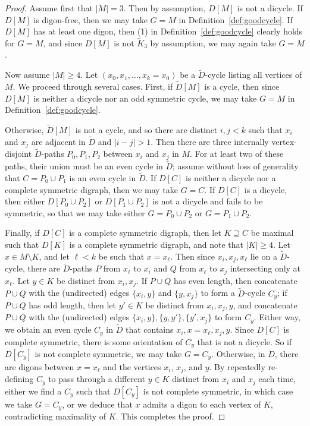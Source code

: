 \documentclass[psamsfonts]{amsart}
\theoremstyle{definition}
\theoremstyle{remark}
\numberwithin{equation}{section}
\begin{document}
\begin{proof}
    Assume first that $\vert M \vert = 3$. Then by assumption, $D[M]$ is not a dicycle. If $D[M]$ is digon-free, then we may take $G = M$ in Definition~\ref{def:goodcycle}. If $D[M]$ has at least one digon, then (1) in Definition~\ref{def:goodcycle} clearly holds for $G = M$, and since $D[M]$ is not $\overleftrightarrow{K}_3$ by assumption, we may again take $G = M$.

    Now assume $\vert M \vert \geq 4$. Let $(x_0, x_1, \dots, x_k = x_0)$ be a $\tilde{D}$-cycle listing all vertices of $M$. We proceed through several cases. First, if $\tilde{D}[M]$ is a cycle, then since $D[M]$ is neither a dicycle nor an odd symmetric cycle, we may take $G = M$ in Definition~\ref{def:goodcycle}.
    
    Otherwise, $\tilde{D}[M]$ is not a cycle, and so there are distinct $i, j < k$ such that $x_i$ and $x_j$ are adjacent in $\tilde{D}$ and $\vert i - j \vert > 1$. Then there are three internally vertex-disjoint $\tilde{D}$-paths $P_0, P_1, P_2$ between $x_i$ and $x_j$ in $M$. For at least two of these paths, their union must be an even cycle in $\tilde{D}$; assume without loss of generality that $C = P_0 \cup P_1$ is an even cycle in $\tilde{D}$. If $D[C]$ is neither a dicycle nor a complete symmetric digraph, then we may take $G = C$. If $D[C]$ is a dicycle, then either $D[P_0 \cup P_2]$ or $D[P_1 \cup P_2]$ is not a dicycle and fails to be symmetric, so that we may take either $G = P_0 \cup P_2$ or $G = P_1 \cup P_2$. 

    Finally, if $D[C]$ is a complete symmetric digraph, then let $K \supseteq C$ be maximal such that $D[K]$ is a complete symmetric digraph, and note that $\vert K \vert \geq 4$. Let $x \in M \setminus K$, and let $\ell < k$ be such that $x = x_{\ell}$. Then since $x_i, x_j, x_{\ell}$ lie on a $\tilde{D}$-cycle, there are $\tilde{D}$-paths $P$ from $x_{\ell}$ to $x_i$ and $Q$ from $x_{\ell}$ to $x_j$ intersecting only at $x_{\ell}$. Let $y \in K$ be distinct from $x_i, x_j$. If $P \cup Q$ has even length, then concatenate $P \cup Q$ with the (undirected) edges $\{x_i, y\}$ and $\{y, x_j\}$ to form a $\tilde{D}$-cycle $C_y$; if $P \cup Q$ has odd length, then let $y' \in K$ be distinct from $x_i, x_j, y$, and concatenate $P \cup Q$ with the (undirected) edges $\{x_i, y\}, \{y, y'\}, \{y', x_j\}$ to form $C_y$. Either way, we obtain an even cycle $C_y$ in $\tilde{D}$ that contains $x_i, x = x_{\ell}, x_j, y$. Since $D[C]$ is complete symmetric, there is some orientation of $C_y$ that is not a dicycle. So if $D[C_y]$ is not complete symmetric, we may take $G = C_y$. Otherwise, in $D$, there are digons between $x = x_{\ell}$ and the vertices $x_i$, $x_j$, and $y$. By repeatedly re-defining $C_y$ to pass through a different $y \in K$ distinct from $x_i$ and $x_j$ each time, either we find a $C_y$ such that $D[C_y]$ is not complete symmetric, in which case we take $G = C_y$, or we deduce that $x$ admits a digon to each vertex of $K$, contradicting maximality of $K$. This completes the proof.
\end{proof}
\end{document}
